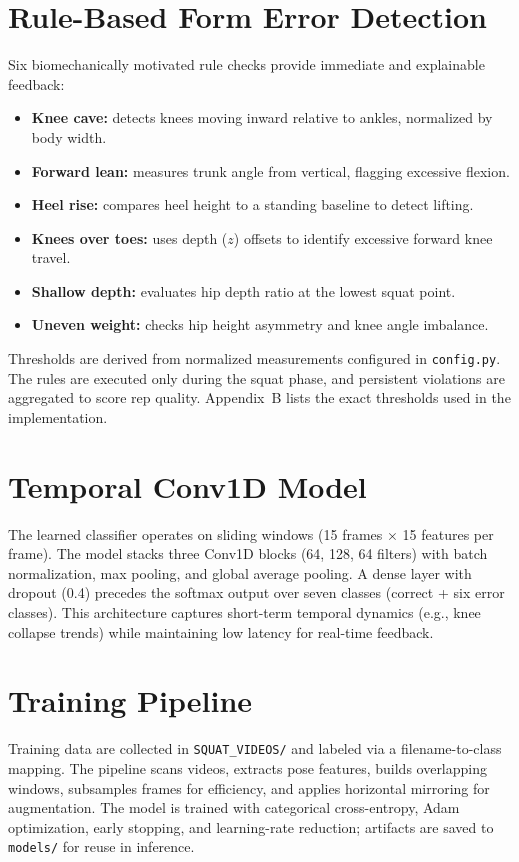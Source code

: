 \documentclass[11pt]{article}
\begin{document}
\section{Rule-Based Form Error Detection}
Six biomechanically motivated rule checks provide immediate and explainable feedback:
\begin{itemize}
  \item \textbf{Knee cave:} detects knees moving inward relative to ankles, normalized by body width.
  \item \textbf{Forward lean:} measures trunk angle from vertical, flagging excessive flexion.
  \item \textbf{Heel rise:} compares heel height to a standing baseline to detect lifting.
  \item \textbf{Knees over toes:} uses depth (\(z\)) offsets to identify excessive forward knee travel.
  \item \textbf{Shallow depth:} evaluates hip depth ratio at the lowest squat point.
  \item \textbf{Uneven weight:} checks hip height asymmetry and knee angle imbalance.
\end{itemize}

Thresholds are derived from normalized measurements configured in \texttt{config.py}. The rules are executed only during the squat phase, and persistent violations are aggregated to score rep quality. Appendix~B lists the exact thresholds used in the implementation.

\section{Temporal Conv1D Model}
The learned classifier operates on sliding windows (15 frames \(\times\) 15 features per frame). The model stacks three Conv1D blocks (64, 128, 64 filters) with batch normalization, max pooling, and global average pooling. A dense layer with dropout (0.4) precedes the softmax output over seven classes (correct + six error classes). This architecture captures short-term temporal dynamics (e.g., knee collapse trends) while maintaining low latency for real-time feedback.

\section{Training Pipeline}
Training data are collected in \texttt{SQUAT\_VIDEOS/} and labeled via a filename-to-class mapping. The pipeline scans videos, extracts pose features, builds overlapping windows, subsamples frames for efficiency, and applies horizontal mirroring for augmentation. The model is trained with categorical cross-entropy, Adam optimization, early stopping, and learning-rate reduction; artifacts are saved to \texttt{models/} for reuse in inference.
\end{document}
